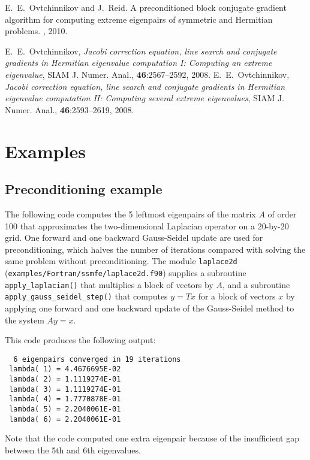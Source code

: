 
E.~E.~Ovtchinnikov and J.~Reid.
A preconditioned block conjugate gradient
algorithm for computing extreme eigenpairs
of symmetric and Hermitian problems.
\report, 2010.

E.~E.~Ovtchinnikov,
{\em Jacobi correction equation, line search and
conjugate gradients in Hermitian eigenvalue computation I:
Computing an extreme eigenvalue},
SIAM J. Numer. Anal., {\bf 46}:2567--2592, 2008.
E.~E.~Ovtchinnikov,
{\em Jacobi correction equation, line search and
conjugate gradients in Hermitian eigenvalue computation II:
Computing several extreme eigenvalues},
SIAM J. Numer. Anal., {\bf 46}:2593--2619, 2008.


\section{Examples}

\subsection{Preconditioning example}
\label{sec:ex.prec}

The following code 
computes the 5 leftmost eigenpairs of 
the matrix $A$ of order 100 that approximates 
the two-dimensional Laplacian operator
on a 20-by-20 grid.
One forward and one backward Gauss-Seidel update
are used for preconditioning,
which halves the number of iterations
compared with solving the same problem without preconditioning.
The module {\tt laplace2d} (\texttt{examples/Fortran/ssmfe/laplace2d.f90})
supplies a subroutine {\tt apply\_laplacian()}
that multiplies a block of vectors by $A$,
and a subroutine 
{\tt apply\_gauss\_seidel\_step()}
that computes $y = T x$ for a block of vectors $x$
by applying one forward and one backward update
of the Gauss-Seidel method to the system $A y = x$.

This code produces the following output:
\begin{verbatim}
  6 eigenpairs converged in 19 iterations
 lambda( 1) = 4.4676695E-02
 lambda( 2) = 1.1119274E-01
 lambda( 3) = 1.1119274E-01
 lambda( 4) = 1.7770878E-01
 lambda( 5) = 2.2040061E-01
 lambda( 6) = 2.2040061E-01
\end{verbatim}

Note that the code computed one extra eigenpair
because of the insufficient gap between the 5th and 6th
eigenvalues.

